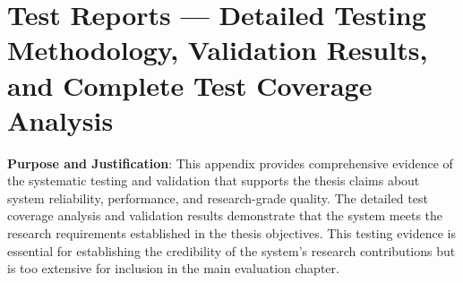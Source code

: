 \chapter{Test Reports — Detailed Testing Methodology, Validation Results, and Complete Test Coverage Analysis}

\textbf{Purpose and Justification}: This appendix provides comprehensive evidence of the systematic testing and validation that supports the thesis claims about system reliability, performance, and research-grade quality. The detailed test coverage analysis and validation results demonstrate that the system meets the research requirements established in the thesis objectives. This testing evidence is essential for establishing the credibility of the system's research contributions but is too extensive for inclusion in the main evaluation chapter.



